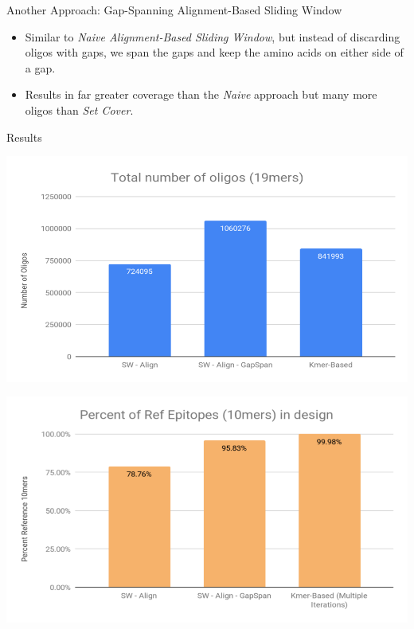\documentclass[final]{beamer}
\newlength{\colwidth}
\begin{document}
\begin{frame}[t]
\begin{columns}[t]
\begin{column}{\colwidth}
\begin{block}{Another Approach: Gap-Spanning Alignment-Based Sliding Window}
    \begin{itemize}
    \item Similar to \emph{Naive Alignment-Based Sliding Window}, but instead of discarding oligos with gaps,
          we span the gaps and keep the amino acids on either side of a gap.
      \item Results in far greater coverage than the \emph{Naive} approach but many more oligos than \emph{Set Cover}.
    \end{itemize}
  \end{block}

  \begin{block}{Results}
    \begin{minipage}[t]{0.5\colwidth}
        \includegraphics[width=0.5\colwidth,height=15\baselineskip]{figures/total_num_oligos.png}
    \end{minipage}%
    \begin{minipage}[t]{0.5\colwidth}
      \includegraphics[width=0.5\colwidth,height=15\baselineskip]{figures/percent_ref_epis.png}
    \end{minipage}
  \end{block}


\end{column}
\end{columns}
\end{frame}
\end{document}
